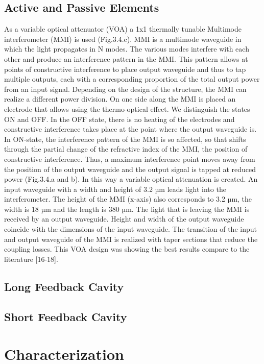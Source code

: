 \subsection{Active and Passive Elements}
As a variable optical attenuator (VOA) a 1x1 thermally tunable Multimode interferometer (MMI) is used (Fig.3.4.c). MMI is a multimode waveguide in which the light propagates in N modes. The various modes interfere with each other and produce an interference pattern in the MMI. This pattern allows at points of constructive interference to place output waveguide and thus to tap multiple outputs, each with a corresponding proportion of the total output power from an input signal. Depending on the design of the structure, the MMI can realize a different power division. On one side along the MMI is placed an electrode that allows using the thermo-optical effect. 
We distinguish the states ON and OFF. In the OFF state, there is no heating of the electrodes and constructive interference takes place at the point where the output waveguide is. In ON-state, the interference pattern of the MMI is so affected, so that shifts through the partial change of the refractive index of the MMI, the position of constructive interference. Thus, a maximum interference point moves away from the position of the output waveguide and the output signal is tapped at reduced power (Fig.3.4.a and b). In this way a variable optical attenuation is created.
An input waveguide with a width and height of 3.2 µm leads light into the interferometer. The height of the MMI (x-axis) also corresponds to 3.2 µm, the width is 18 µm and the length is 380 µm. The light that is leaving the MMI is received by an output waveguide. Height and width of the output waveguide coincide with the dimensions of the input waveguide. The transition of the input and output waveguide of the MMI is realized with taper sections that reduce the coupling losses. This VOA design was showing the best results compare to the literature [16-18].

\subsection{Long Feedback Cavity}

\subsection{Short Feedback Cavity}

\section{Characterization}

